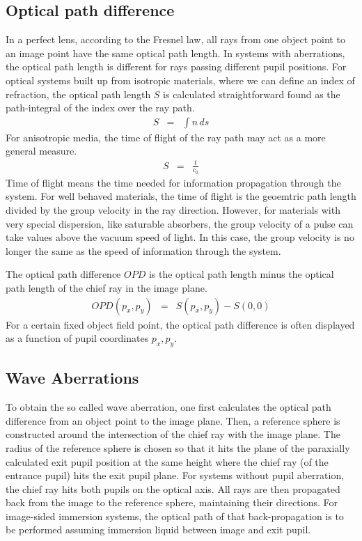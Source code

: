 \documentclass[12pt,a4paper,twoside,openright,BCOR10mm,headsepline,titlepage,abstracton,chapterprefix,final]{scrreprt}
\begin{document}
\subsection{Optical path difference}
In a perfect lens, according to the Fresnel law, all rays from one object point to an image point have the same optical path length. 
In systems with aberrations, the optical path length is different for rays passing different pupil positions.
For optical systems built up from isotropic materials, where we can define an index of refraction, the optical path length $S$ is calculated straightforward found as the path-integral of the index over the ray path.
\begin{eqnarray}
 S &=& \int n\, ds
\end{eqnarray}
For anisotropic media, the time of flight of the ray path may act as a more general measure.
\begin{eqnarray}
 S &=& \frac{t}{c_0}
\end{eqnarray}
Time of flight means the time needed for information propagation through the system.
For well behaved materials, the time of flight is the geoemtric path length divided by the group velocity in the ray direction. 
However, for materials with very special dispersion, like saturable absorbers, the group velocity of a pulse can take values above the vacuum speed of light. 
In this case, the group velocity is no longer the same as the speed of information through the system.

The optical path difference $OPD$ is the optical path length minus the optical path length of the chief ray in the image plane.
\begin{eqnarray}
 OPD(p_x,p_y) &=& S(p_x,p_y) - S(0,0)
\end{eqnarray}
For a certain fixed object field point, the optical path difference is often displayed as a function of pupil coordinates $p_x,p_y$.

\subsection{Wave Aberrations}
To obtain the so called wave aberration, one first calculates the optical path difference from an object point to the image plane.
Then, a reference sphere is constructed around the intersection of the chief ray with the image plane. 
The radius of the reference sphere is chosen so that it hits the plane of the paraxially calculated exit pupil position at the same height where the chief ray (of the entrance pupil) hits the exit pupil plane.
For systems without pupil aberration, the chief ray hits both pupils on the optical axis.
All rays are then propagated back from the image to the reference sphere, maintaining their directions.
For image-sided immersion systems, the optical path of that back-propagation is to be performed assuming immersion liquid between image and exit pupil.
\end{document}
